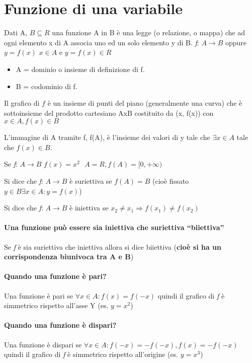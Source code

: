 \section{Funzione di una variabile}
\begin{defi}
Dati A, $B\subseteq R$ una funzione A in B è una legge (o relazione, o mappa)
che ad ogni elemento x di A associa uno ed un solo elemento y di B.
\textit{f}: $A\to B$ oppure $y=f(x)$ $x\in A$ e $y=f(x)\in R$
\begin{itemize}
	\item A = dominio o insieme di definizione di f.
	\item B = codominio di f.
\end{itemize}
Il grafico di $f$ è un insieme di punti del piano (generalmente una curva) che è
sottoinsieme del prodotto cartesiano AxB costituito da (x, f(x)) con $x\in A,
f(x)\in B$
\end{defi}
\begin{defi}
L'immagine di A tramite f, f(A), è l'insieme dei valori di y tale che $\exists
x \in A$ tale che $f(x) \in B$.
	\begin{esempio} Se \textit{f}: $A\to B$ $f(x)=x^2 \text{ } A=R,
	f(A)=[0,+\infty)$\end{esempio}
\end{defi}
\begin{defi}
	Si dice che \textit{f}: $A\to B$
	è suriettiva se $f(A)=B$ (cioè fissato $y\in B \exists x\in A: y=f(x)$)
\end{defi}
\begin{defi}
	Si dice che \textit{f}: $A\to B$ è iniettiva 
	se $x_2\neq x_1\Rightarrow f(x_1) \neq f(x_2)$
\end{defi}
\paragraph{Una funzione può essere sia iniettiva che suriettiva ``biiettiva''}
Se \textit{f} è sia suriettiva che iniettiva allora si dice biiettiva (\textbf{cioè si
ha un corrispondenza biunivoca tra A e B})
\paragraph{Quando una funzione è pari?}
Una funzione è pari se $\forall x\in A: f(x)=f(-x)$ quindi il grafico di
\textit{f} è simmetrico rispetto all'asse Y (es. $y=x^2$)
\paragraph{Quando una funzione è dispari?}
Una funzione è dispari se $\forall x\in A: f(-x)=-f(-x), f(x)=-f(-x)$ quindi il
grafico di \textit{f} è simmetrico rispetto all'origine (es. $y=x^3$)
